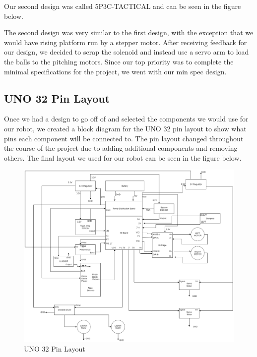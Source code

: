 \documentclass{article}
\begin{document}
Our second design was called 5P3C-TACTICAL and can be seen in the figure below.  


\noindent The second design was very similar to the first design, with the exception that we would have rising platform run by a stepper motor.  After receiving feedback for our design, we decided to scrap the solenoid and instead use a servo arm to load the balls to the pitching motors.  Since our top priority was to complete the minimal specifications for the project, we went with our min spec design. 

\subsection{UNO 32 Pin Layout}
Once we had a design to go off of and selected the components we would use for our robot, we created a block diagram for the UNO 32 pin layout to show what pins each component will be connected to.  The pin layout changed throughout the course of the project due to adding additional components and removing others.  The final layout we used for our robot can be seen in the figure below.

\begin{figure}[H]
    \centering
    \includegraphics[scale = 0.35]{Mech_block_diagram.png}
    \caption{UNO 32 Pin Layout}
\end{figure}
\end{document}
